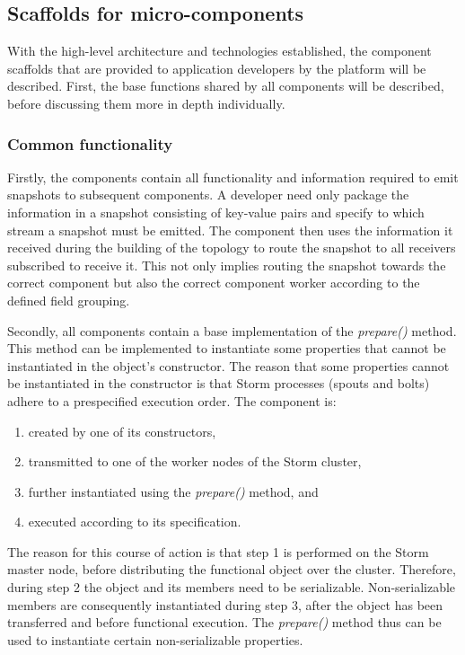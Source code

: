 \subsection{Scaffolds for micro-components}
With the high-level architecture and technologies established, the component scaffolds that are provided to application developers by the platform will be described. First, the base functions shared by all components will be described, before discussing them more in depth individually.

\subsubsection*{Common functionality}
Firstly, the components contain all functionality and information required to emit snapshots to subsequent components. A developer need only package the information in a snapshot consisting of key-value pairs and specify to which stream a snapshot must be emitted. The component then uses the information it received during the building of the topology to route the snapshot to all receivers subscribed to receive it. This not only implies routing the snapshot towards the correct component but also the correct component worker according to the defined field grouping.

Secondly, all components contain a base implementation of the \emph{prepare()} method. This method can be implemented to instantiate some properties that cannot be instantiated in the object's constructor. The reason that some properties cannot be instantiated in the constructor is that Storm processes (spouts and bolts) adhere to a prespecified execution order. The component is:
\begin{enumerate}
\nospace
\item created by one of its constructors,
\item transmitted to one of the worker nodes of the Storm cluster,
\item further instantiated using the \emph{prepare()} method, and
\item executed according to its specification.
\end{enumerate}
The reason for this course of action is that step 1 is performed on the Storm master node, before distributing the functional object over the cluster. Therefore, during step 2 the object and its members need to be serializable. Non-serializable members are consequently instantiated during step 3, after the object has been transferred and before functional execution. The \emph{prepare()} method thus can be used to instantiate certain non-serializable properties.

